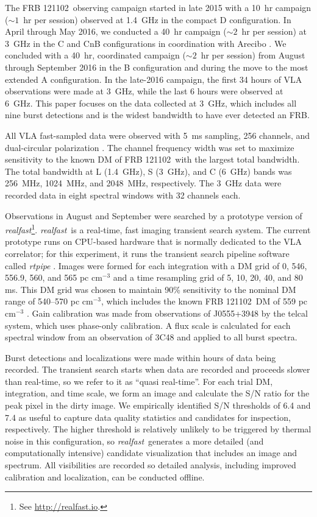 \documentclass[twocolumn]{aastex61}
\newcommand{\rf}{\emph{realfast}}
\newcommand{\frb}{FRB 121102}
\begin{document}
The \frb\ observing campaign started in late 2015 with a 10~hr campaign ($\sim1$~hr per session) observed at 1.4~GHz in the compact D configuration. In April through May 2016, we conducted a 40~hr campaign ($\sim2$~hr per session) at 3~GHz in the C and CnB configurations in coordination with Arecibo \citep{2016arXiv160308880S}. We concluded with a 40~hr, coordinated campaign ($\sim2$~hr per session) from August through September 2016 in the B configuration and during the move to the most extended A configuration. In the late-2016 campaign, the first 34 hours of VLA observations were made at 3~GHz, while the last 6 hours were observed at 6~GHz. This paper focuses on the data collected at 3~GHz, which includes all nine burst detections and is the widest bandwidth to have ever detected an FRB.

All VLA fast-sampled data were observed with 5~ms sampling, 256 channels, and dual-circular polarization \citep{2015ApJ...807...16L}. The channel frequency width was set to maximize sensitivity to the known DM of \frb\ with the largest total bandwidth. The total bandwidth at L (1.4~GHz), S (3~GHz), and C (6~GHz) bands was 256~MHz, 1024~MHz, and 2048~MHz, respectively. The 3~GHz data were recorded data in eight spectral windows with 32 channels each.

Observations in August and September were searched by a prototype version of \rf\footnote{See \url{http://realfast.io}.}. \rf\ is a real-time, fast imaging transient search system. The current prototype runs on CPU-based hardware that is normally dedicated to the VLA correlator; for this experiment, it runs the transient search pipeline software called \emph{rtpipe} \citep[\url{https://github.com/caseyjlaw/rtpipe};][]{2015ApJ...807...16L}. Images were formed for each integration with a DM grid of 0, 546, 556.9, 560, and 565 pc cm$^{-3}$ and a time resampling grid of 5, 10, 20, 40, and 80 ms. This DM grid was chosen to maintain 90\% sensitivity to the nominal DM range of 540--570 pc cm$^{-3}$, which includes the known \frb\ DM of 559 pc cm$^{-3}$ \citep{2016arXiv160308880S}. Gain calibration was made from observations of J0555+3948 by the telcal system, which uses phase-only calibration. A flux scale is calculated for each spectral window from an observation of 3C48 and applied to all burst spectra.

Burst detections and localizations were made within hours of data being recorded. The transient search starts when data are recorded and proceeds slower than real-time, so we refer to it as ``quasi real-time''. For each trial DM, integration, and time scale, we form an image and calculate the S/N ratio for the peak pixel in the dirty image. We empirically identified S/N thresholds of 6.4 and 7.4 as useful to capture data quality statistics and candidates for inspection, respectively. The higher threshold is relatively unlikely to be triggered by thermal noise in this configuration, so \rf\ generates a more detailed (and computationally intensive) candidate visualization that includes an image and spectrum. All visibilities are recorded so detailed analysis, including improved calibration and localization, can be conducted offline. 
\end{document}

